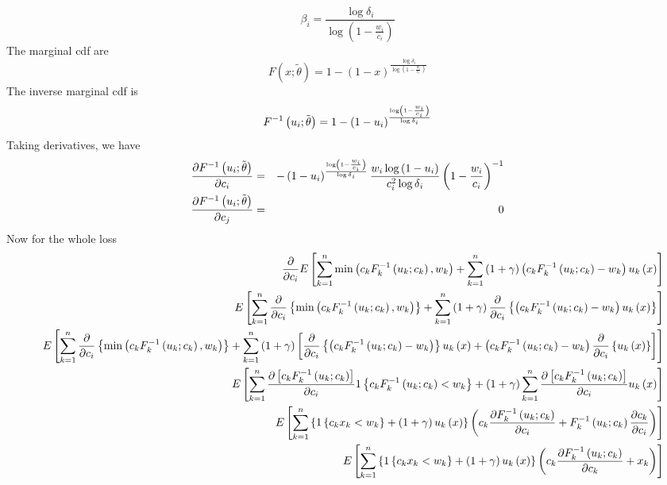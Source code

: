 \documentclass{article}
\begin{document}
\[
\beta _{i}=\frac{\log \delta _{i}}{\log \left( 1-\frac{w_{i}}{c_{i}}\right) }
\]%
The marginal cdf are%
\[
F\left( x;\tilde{\theta}\right) =1-\left( 1-x\right) ^{\frac{\log \delta _{i}%
}{\log \left( 1-\frac{w_{i}}{c_{i}}\right) }}
\]%
The inverse marginal cdf is%
\[
F^{-1}\left( u_{i};\tilde{\theta}\right) =1-\left( 1-u_{i}\right) ^{\frac{%
\log \left( 1-\frac{w_{i}}{c_{i}}\right) }{\log \delta _{i}}}
\]%
Taking derivatives, we have%
\begin{eqnarray*}
\frac{\partial F^{-1}\left( u_{i};\tilde{\theta}\right) }{\partial c_{i}}
&=&-\left( 1-u_{i}\right) ^{\frac{\log \left( 1-\frac{w_{i}}{c_{i}}\right) }{%
\log \delta _{i}}}\frac{w_{i}\log \left( 1-u_{i}\right) }{c_{i}^{2}\log
\delta _{i}}\left( 1-\frac{w_{i}}{c_{i}}\right) ^{-1} \\
\frac{\partial F^{-1}\left( u_{i};\tilde{\theta}\right) }{\partial c_{j}}
&=&0
\end{eqnarray*}%
Now for the whole loss%
\begin{eqnarray*}
&&\frac{\partial }{\partial c_{i}}E\left[ \sum_{k=1}^{n}\min \left(
c_{k}F_{k}^{-1}\left( u_{k};c_{k}\right) ,w_{k}\right) +\sum_{k=1}^{n}\left(
1+\gamma \right) \left( c_{k}F_{k}^{-1}\left( u_{k};c_{k}\right)
-w_{k}\right) u_{k}\left( x\right) \right]  \\
&&E\left[ \sum_{k=1}^{n}\frac{\partial }{\partial c_{i}}\left\{ \min \left(
c_{k}F_{k}^{-1}\left( u_{k};c_{k}\right) ,w_{k}\right) \right\}
+\sum_{k=1}^{n}\left( 1+\gamma \right) \frac{\partial }{\partial c_{i}}%
\left\{ \left( c_{k}F_{k}^{-1}\left( u_{k};c_{k}\right) -w_{k}\right)
u_{k}\left( x\right) \right\} \right]  \\
&&E\left[ \sum_{k=1}^{n}\frac{\partial }{\partial c_{i}}\left\{ \min \left(
c_{k}F_{k}^{-1}\left( u_{k};c_{k}\right) ,w_{k}\right) \right\}
+\sum_{k=1}^{n}\left( 1+\gamma \right) \left[ \frac{\partial }{\partial c_{i}%
}\left\{ \left( c_{k}F_{k}^{-1}\left( u_{k};c_{k}\right) -w_{k}\right)
\right\} u_{k}\left( x\right) +\left( c_{k}F_{k}^{-1}\left(
u_{k};c_{k}\right) -w_{k}\right) \frac{\partial }{\partial c_{i}}\left\{
u_{k}\left( x\right) \right\} \right] \right]  \\
&&E\left[ \sum_{k=1}^{n}\frac{\partial \left[ c_{k}F_{k}^{-1}\left(
u_{k};c_{k}\right) \right] }{\partial c_{i}}1\left\{ c_{k}F_{k}^{-1}\left(
u_{k};c_{k}\right) <w_{k}\right\} +\left( 1+\gamma \right) \sum_{k=1}^{n}%
\frac{\partial \left[ c_{k}F_{k}^{-1}\left( u_{k};c_{k}\right) \right] }{%
\partial c_{i}}u_{k}\left( x\right) \right]  \\
&&E\left[ \sum_{k=1}^{n}\left\{ 1\left\{ c_{k}x_{k}<w_{k}\right\} +\left(
1+\gamma \right) u_{k}\left( x\right) \right\} \left( c_{k}\frac{\partial
F_{k}^{-1}\left( u_{k};c_{k}\right) }{\partial c_{i}}+F_{k}^{-1}\left(
u_{k};c_{k}\right) \frac{\partial c_{k}}{\partial c_{i}}\right) \right]  \\
&&E\left[ \sum_{k=1}^{n}\left\{ 1\left\{ c_{k}x_{k}<w_{k}\right\} +\left(
1+\gamma \right) u_{k}\left( x\right) \right\} \left( c_{k}\frac{\partial
F_{k}^{-1}\left( u_{k};c_{k}\right) }{\partial c_{k}}+x_{k}\right) \right] 
\end{eqnarray*}%
\end{document}
